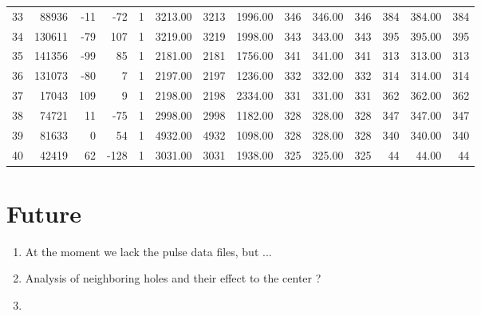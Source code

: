 \documentclass[notitlepage,a4paper]{article}\usepackage[]{graphicx}\usepackage[]{color}
\begin{document}
\begin{scriptsize}
\begin{landscape}
\begin{table}[ht]
\begin{tabular}{rrrrrrrrrrrrrr}
  33 & 88936 & -11 & -72 &   1 & 3213.00 & 3213 & 1996.00 & 346 & 346.00 & 346 & 384 & 384.00 & 384 \\ 
  34 & 130611 & -79 & 107 &   1 & 3219.00 & 3219 & 1998.00 & 343 & 343.00 & 343 & 395 & 395.00 & 395 \\ 
  35 & 141356 & -99 &  85 &   1 & 2181.00 & 2181 & 1756.00 & 341 & 341.00 & 341 & 313 & 313.00 & 313 \\ 
  36 & 131073 & -80 &   7 &   1 & 2197.00 & 2197 & 1236.00 & 332 & 332.00 & 332 & 314 & 314.00 & 314 \\ 
  37 & 17043 & 109 &   9 &   1 & 2198.00 & 2198 & 2334.00 & 331 & 331.00 & 331 & 362 & 362.00 & 362 \\ 
  38 & 74721 &  11 & -75 &   1 & 2998.00 & 2998 & 1182.00 & 328 & 328.00 & 328 & 347 & 347.00 & 347 \\ 
  39 & 81633 &   0 &  54 &   1 & 4932.00 & 4932 & 1098.00 & 328 & 328.00 & 328 & 340 & 340.00 & 340 \\ 
  40 & 42419 &  62 & -128 &   1 & 3031.00 & 3031 & 1938.00 & 325 & 325.00 & 325 &  44 & 44.00 &  44 \\ 
   \hline
\end{tabular}
\end{table}

\end{landscape}
\end{scriptsize}

\section{Future}
\begin{enumerate}
  \item At the moment we lack the pulse data files, but ...
  \item Analysis of neighboring holes and their effect to the center ?
  \item 
  
\end{enumerate}
\end{document}
